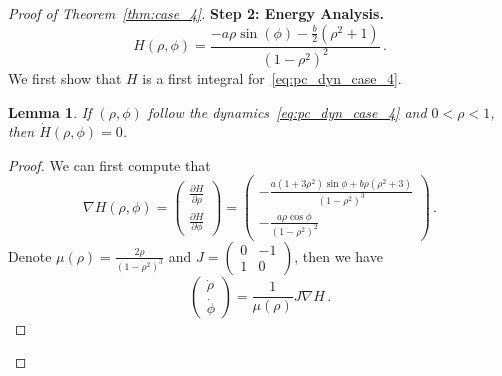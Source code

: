 \documentclass[10pt]{article}
\newtheorem{lemma}[theorem]{Lemma}
\theoremstyle{definition}
\theoremstyle{definition}
\numberwithin{equation}{section}
\begin{document}
\begin{proof}[Proof of Theorem~\ref{thm:case_4}]

\textbf{Step 2: Energy Analysis.} 
\begin{equation}\label{eq:case_4_energy}
H(\rho, \phi) = \frac{-a \rho\sin(\phi) - \frac{b}{2}(\rho^2 + 1)}{(1-\rho^2)^2} \, .
\end{equation}
We first show that $H$ is a first integral for~\eqref{eq:pc_dyn_case_4}.

\begin{lemma} \label{lemma:case_4_energy}
    If $(\rho, \phi)$ follow the dynamics~\eqref{eq:pc_dyn_case_4} and $0 < \rho < 1$, then $\dot H(\rho, \phi) = 0$.
\end{lemma}
\begin{proof}
    We can first 
    compute that
    \begin{equation}\label{eq:case4_nabla_H}
    \nabla H (\rho, \phi) = 
    \begin{pmatrix}
            \frac{\partial H}{\partial \rho} \\[5pt] \frac{\partial H}{\partial \phi}
    \end{pmatrix}
    = \begin{pmatrix}
            -\frac{a(1 + 3\rho^2) \sin \phi + b \rho (\rho^2 + 3)}{(1-\rho^2)^3} \\[5pt] - \frac{a \rho \cos \phi}{(1-\rho^2)^2}
    \end{pmatrix} \, .
    \end{equation} 
    Denote $\mu(\rho) = \frac{2\rho}{(1- \rho^2)^3}$ and $J = \begin{pmatrix}
        0 & -1 \\ 1& 0
    \end{pmatrix}$, then
    we have
    \begin{equation}\label{eq:case4_pc_vec_and_nabla_H}
        \begin{pmatrix}
            \dot \rho \\ \dot \phi
        \end{pmatrix} = \frac{1}{\mu(\rho)} J \nabla H \, .

\end{equation}
\end{proof}
\end{proof}
\end{document}
